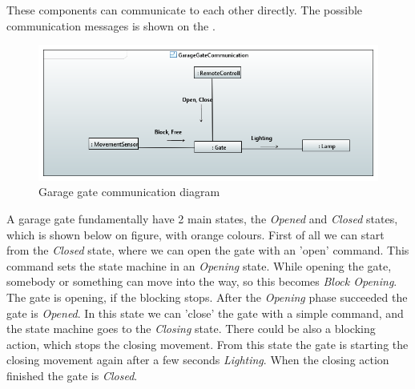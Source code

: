 These components can communicate to each other directly. The possible communication messages is shown on the .

\begin{figure}[!ht]
	\centering
	\includegraphics[width=150mm, keepaspectratio]{figures/communication.png}
	\caption{Garage gate communication diagram}
	\label{fig:Garage communication}
\end{figure}

A garage gate fundamentally have 2 main states, the \textit{Opened} and \textit{Closed} states, which is shown below on  figure, with orange colours.  First of all we can start from the \textit{Closed} state, where we can open the gate with an 'open' command. This command sets the state machine in an \textit{Opening} state. While opening the gate, somebody or something can move into the way, so this becomes \textit{Block Opening}. The gate is opening, if the blocking stops. After the \textit{Opening} phase succeeded the gate is \textit{Opened}. In this state we can 'close' the gate with a simple command, and the state machine goes to the \textit{Closing} state. There could be also a blocking action, which stops the closing movement. From this state the gate is starting the closing movement again after a few seconds \textit{Lighting}. When the closing action finished the gate is \textit{Closed}.



